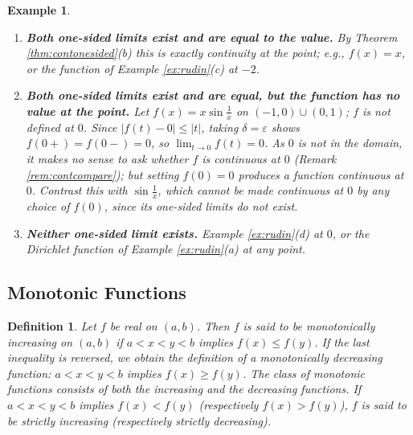 \documentclass{article}
\theoremstyle{mythm}
\newtheorem{definition}[theorem]{Definition}
\newtheorem{example}[theorem]{Example}
\begin{document}
\begin{example}
\begin{enumerate}[label=(\roman*)]
    \item \textbf{Both one-sided limits exist and are equal to the value.} By Theorem \ref{thm:contonesided}(b) this is exactly continuity at the point; e.g., $f(x) = x$, or the function of Example \ref{ex:rudin}(c) at $-2$.

    \item \textbf{Both one-sided limits exist and are equal, but the function has no value at the point.} Let $f(x) = x \sin\frac{1}{x}$ on $(-1,0) \cup (0,1)$; $f$ is not defined at $0$. Since $|f(t) - 0| \leq |t|$, taking $\delta = \varepsilon$ shows $f(0+) = f(0-) = 0$, so $\lim_{t\to 0} f(t) = 0$. As $0$ is not in the domain, it makes no sense to ask whether $f$ is continuous at $0$ (Remark \ref{rem:contcompare}); but setting $f(0) = 0$ produces a function continuous at $0$. Contrast this with $\sin\frac1x$, which cannot be made continuous at $0$ by any choice of $f(0)$, since its one-sided limits do not exist.

    \item \textbf{Neither one-sided limit exists.} Example \ref{ex:rudin}(d) at $0$, or the Dirichlet function of Example \ref{ex:rudin}(a) at any point.
\end{enumerate}
\end{example}

\subsection{Monotonic Functions}

\begin{definition}\label{def:monotone}
Let $f$ be real on $(a,b)$. Then $f$ is said to be \textit{monotonically increasing} on $(a,b)$ if $a < x < y < b$ implies $f(x) \leq f(y)$. If the last inequality is reversed, we obtain the definition of a \textit{monotonically decreasing} function: $a < x < y < b$ implies $f(x) \geq f(y)$. The class of \textit{monotonic} functions consists of both the increasing and the decreasing functions. If $a < x < y < b$ implies $f(x) < f(y)$ (respectively $f(x) > f(y)$), $f$ is said to be \textit{strictly} increasing (respectively strictly decreasing).
\end{definition}
\end{document}
